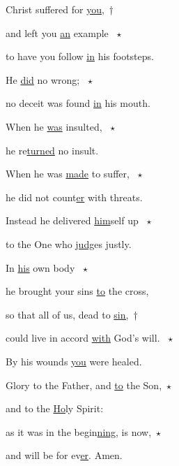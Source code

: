 \noindent Christ suffered for \uline{you,}~†~\nopagebreak

and left you \uline{an} example ~$\star$~\nopagebreak

to have you follow \uline{in} his footsteps.

\noindent He \uline{did} no wrong; ~$\star$~\nopagebreak

no deceit was found \uline{in} his mouth.

\noindent When he \uline{was} insulted, ~$\star$~\nopagebreak

he re\uline{turned} no insult.

\noindent When he was \uline{made} to suffer, ~$\star$~\nopagebreak

he did not count\uline{er} with threats.

\noindent Instead he delivered \uline{him}self up ~$\star$~\nopagebreak

to the One who \uline{judg}es justly.

\noindent In \uline{his} own body ~$\star$~\nopagebreak

he brought your sins \uline{to} the cross,

\noindent so that all of us, dead to \uline{sin,}~†~\nopagebreak

could live in accord \uline{with} God’s will. ~$\star$~\nopagebreak

By his wounds \uline{you} were healed.

\noindent Glory to the Father, and \uline{to} the Son,~$\star$~\nopagebreak

and to the \uline{Ho}ly Spirit:

\noindent as it was in the begin\uline{ning}, is now,~$\star$~\nopagebreak

and will be for ev\uline{er}. Amen.
